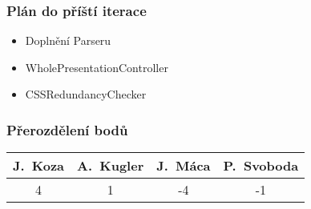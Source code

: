 \documentclass{beamer}
\begin{document}
\begin{frame}[allowframebreaks]\frametitle{Plán do příští iterace}
  \begin{itemize}
    \item Doplnění Parseru
		\item WholePresentationController
		\item CSSRedundancyChecker
  \end{itemize}
\end{frame}

\begin{frame}[allowframebreaks]\frametitle{Přerozdělení bodů}
    
    \begin{center}
  \begin{tabular}{| c | c | c | c |}
    \hline
     J.~Koza & A.~Kugler & J.~Máca & P.~Svoboda \\
    \hline
     4 & 1 & -4 & -1 \\
    \hline
  \end{tabular}     
   \end{center}
\end{frame}
\end{document}
